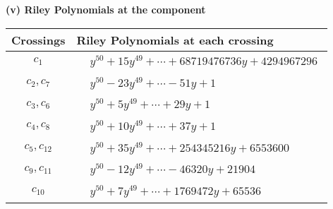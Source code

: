 \documentclass[1p]{elsarticle_modified}
\theoremstyle{definition}
\begin{document}
\flushleft \textbf{(v) Riley Polynomials at the component}\newline \\
\begin{tabular}{m{50pt}|m{274pt}}
Crossings & \hspace{64pt}Riley Polynomials at each crossing \\
\hline $$\begin{aligned}c_{1}\end{aligned}$$&$\begin{aligned}
&y^{50}+15 y^{49}+\cdots+68719476736 y+4294967296
\end{aligned}$\\
\hline $$\begin{aligned}c_{2},c_{7}\end{aligned}$$&$\begin{aligned}
&y^{50}-23 y^{49}+\cdots-51 y+1
\end{aligned}$\\
\hline $$\begin{aligned}c_{3},c_{6}\end{aligned}$$&$\begin{aligned}
&y^{50}+5 y^{49}+\cdots+29 y+1
\end{aligned}$\\
\hline $$\begin{aligned}c_{4},c_{8}\end{aligned}$$&$\begin{aligned}
&y^{50}+10 y^{49}+\cdots+37 y+1
\end{aligned}$\\
\hline $$\begin{aligned}c_{5},c_{12}\end{aligned}$$&$\begin{aligned}
&y^{50}+35 y^{49}+\cdots+254345216 y+6553600
\end{aligned}$\\
\hline $$\begin{aligned}c_{9},c_{11}\end{aligned}$$&$\begin{aligned}
&y^{50}-12 y^{49}+\cdots-46320 y+21904
\end{aligned}$\\
\hline $$\begin{aligned}c_{10}\end{aligned}$$&$\begin{aligned}
&y^{50}+7 y^{49}+\cdots+1769472 y+65536
\end{aligned}$\\
\hline
\end{tabular}\\~\\
\end{document}
